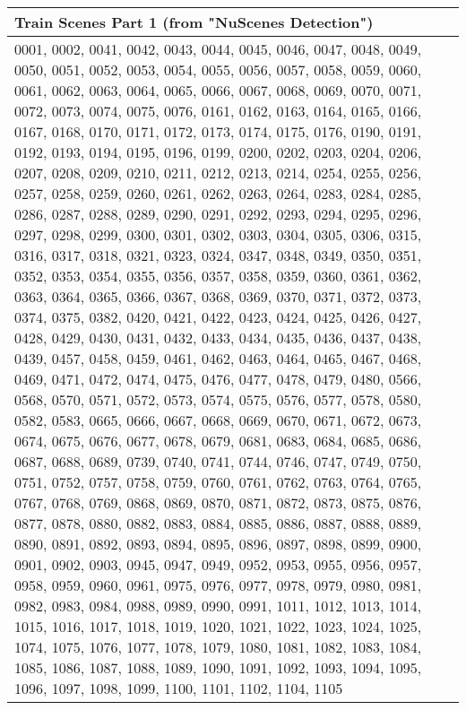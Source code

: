 \begin{center}
	\begin{tabular}{m{15.0cm}}
		Train Scenes Part 1 (from "NuScenes Detection")\\
		\hline
		0001, 0002, 0041, 0042, 0043, 0044, 0045, 0046,
		0047, 0048, 0049, 0050, 0051, 0052, 0053, 0054,
		0055, 0056, 0057, 0058, 0059, 0060, 0061, 0062,
		0063, 0064, 0065, 0066, 0067, 0068, 0069, 0070,
		0071, 0072, 0073, 0074, 0075, 0076, 0161, 0162,
		0163, 0164, 0165, 0166, 0167, 0168, 0170, 0171,
		0172, 0173, 0174, 0175, 0176, 0190, 0191, 0192,
		0193, 0194, 0195, 0196, 0199, 0200, 0202, 0203,
		0204, 0206, 0207, 0208, 0209, 0210, 0211, 0212,
		0213, 0214, 0254, 0255, 0256, 0257, 0258, 0259,
		0260, 0261, 0262, 0263, 0264, 0283, 0284, 0285,
		0286, 0287, 0288, 0289, 0290, 0291, 0292, 0293,
		0294, 0295, 0296, 0297, 0298, 0299, 0300, 0301,
		0302, 0303, 0304, 0305, 0306, 0315, 0316, 0317,
		0318, 0321, 0323, 0324, 0347, 0348, 0349, 0350,
		0351, 0352, 0353, 0354, 0355, 0356, 0357, 0358,
		0359, 0360, 0361, 0362, 0363, 0364, 0365, 0366,
		0367, 0368, 0369, 0370, 0371, 0372, 0373, 0374,
		0375, 0382, 0420, 0421, 0422, 0423, 0424, 0425,
		0426, 0427, 0428, 0429, 0430, 0431, 0432, 0433,
		0434, 0435, 0436, 0437, 0438, 0439, 0457, 0458,
		0459, 0461, 0462, 0463, 0464, 0465, 0467, 0468,
		0469, 0471, 0472, 0474, 0475, 0476, 0477, 0478,
		0479, 0480, 0566, 0568, 0570, 0571, 0572, 0573,
		0574, 0575, 0576, 0577, 0578, 0580, 0582, 0583,
		0665, 0666, 0667, 0668, 0669, 0670, 0671, 0672,
		0673, 0674, 0675, 0676, 0677, 0678, 0679, 0681,
		0683, 0684, 0685, 0686, 0687, 0688, 0689, 0739,
		0740, 0741, 0744, 0746, 0747, 0749, 0750, 0751,
		0752, 0757, 0758, 0759, 0760, 0761, 0762, 0763,
		0764, 0765, 0767, 0768, 0769, 0868, 0869, 0870,
		0871, 0872, 0873, 0875, 0876, 0877, 0878, 0880,
		0882, 0883, 0884, 0885, 0886, 0887, 0888, 0889,
		0890, 0891, 0892, 0893, 0894, 0895, 0896, 0897,
		0898, 0899, 0900, 0901, 0902, 0903, 0945, 0947,
		0949, 0952, 0953, 0955, 0956, 0957, 0958, 0959,
		0960, 0961, 0975, 0976, 0977, 0978, 0979, 0980,
		0981, 0982, 0983, 0984, 0988, 0989, 0990, 0991,
		1011, 1012, 1013, 1014, 1015, 1016, 1017, 1018,
		1019, 1020, 1021, 1022, 1023, 1024, 1025, 1074,
		1075, 1076, 1077, 1078, 1079, 1080, 1081, 1082,
		1083, 1084, 1085, 1086, 1087, 1088, 1089, 1090,
		1091, 1092, 1093, 1094, 1095, 1096, 1097, 1098,
		1099, 1100, 1101, 1102, 1104, 1105
	\end{tabular}
\end{center} 
